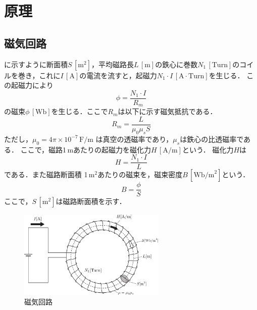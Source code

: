 \clearpage

\section{原理}
\subsection{磁気回路}
に示すように断面積$S\,[\mathrm{m}^2]$，平均磁路長$L\,[\mathrm{m}]$の鉄心に巻数$N_1\,[\mathrm{Turn}]$のコイルを巻き，これに$I\,[\mathrm{A}]$の電流を流すと，起磁力$N_1\cdot I\,[\mathrm{A}\cdot\mathrm{Turn}]$を生じる．
この起磁力により
\begin{equation}
	\phi = \frac{N_1\cdot I}{R_m}
\end{equation}
の磁束$\phi\,[\mathrm{Wb}]$を生じる．ここで$R_m$は以下に示す磁気抵抗である．
\begin{equation}
	R_m= \frac{L}{\mu_0 \mu_s S}
\end{equation}
ただし，$\mu_0 = 4\pi\times 10^{-7}\,\mathrm{F/m}$ は真空の透磁率であり，$\mu_s$は鉄心の比透磁率である．
ここで，磁路1\,mあたりの起磁力を磁化力$H\,[\mathrm{A/m}]$という． 磁化力$H$は
\begin{equation}
	H=\frac{N_1\cdot I}{L}
\end{equation}
である．また磁路断面積 1\,m$^2$あたりの磁束を，磁束密度$B\,[\mathrm{Wb/m}^2]$という．
\begin{equation}
	B=\frac{\phi}{S}
	\label{eq:hys:BphiS}
\end{equation}
ここで，$S\,[\mathrm{m}^2]$は磁路断面積を示す．
\begin{figure}[htbp]
	\centering
	\includegraphics[width=70mm]{fig/magnetism_circuit.pdf}
	\caption{磁気回路}
	\label{fig:hys:jikikairo}
\end{figure}

